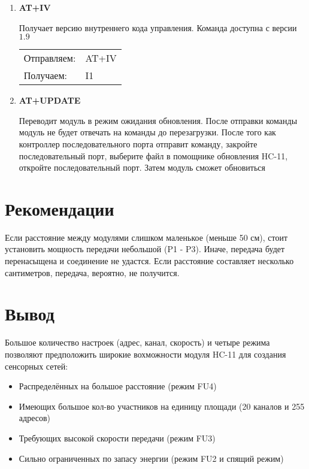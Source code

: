 \documentclass[12pt]{article}
\begin{document}
\begin{enumerate}
\item \textbf{AT+IV}

Получает версию внутреннего кода управления. Команда доступна с версии $1.9$

\begin{tabular}{ l l }
  Отправляем: & AT+IV \\
  Получаем: & I1\\
\end{tabular}


\item \textbf{AT+UPDATE}

Переводит модуль в режим ожидания обновления.
После отправки команды модуль не будет отвечать на команды до перезагрузки.
После того как контроллер последовательного порта отправит команду, закройте последовательный порт, выберите файл в помощнике обновления HC-11, откройте последовательный порт. Затем модуль сможет обновиться

\end{enumerate}

\section{Рекомендации}

Если расстояние между модулями слишком маленькое (меньше 50 см), стоит установить мощность передачи небольшой (P1 - P3). Иначе, передача будет перенасыщена и соединение не удастся. Если расстояние составляет несколько сантиметров, передача, вероятно, не получится.


\section{Вывод}

Большое количество настроек (адрес, канал, скорость) и четыре режима позволяют предположить широкие вохможности модуля HC-11 для создания сенсорных сетей:
 
\begin{itemize}
\item Распределённых на большое расстояние (режим FU4)
\item Имеющих большое кол-во участников на единицу площади (20 каналов и 255 адресов)
\item Требующих высокой скорости передачи (режим FU3)

\item Сильно ограниченных по запасу энергии (режим FU2 и спящий режим)

\end{itemize}
\end{document}
